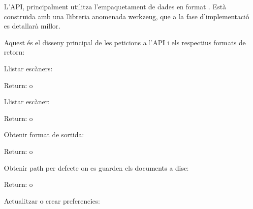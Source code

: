 \documentclass[letterpaper,11pt,catalan]{sphinxmanual}
\begin{document}
L'API, principalment utilitza l'empaquetament de dades en format .
Està construïda amb una llibreria anomenada \sphinxquotedblleft{}werkzeug\sphinxquotedblright{}, que a la fase d'implementació es detallarà millor.

Aquest és el disseny principal de les peticions a l'API i els respectius formats de retorn:

Llistar escàners:

\begin{sphinxVerbatim}[commandchars=\\\{\}]
 
\end{sphinxVerbatim}

Return: \sphinxcode{{[}scanners: n{]}} o \sphinxcode{{[}'NO SCANNERS'{]}}

Llistar escàner:

\begin{sphinxVerbatim}[commandchars=\\\{\}]
 
\end{sphinxVerbatim}

Return: \sphinxcode{{[}scanner: 1{]}} o \sphinxcode{{[}'NO SCANNER'{]}}

Obtenir format de sortida:

\begin{sphinxVerbatim}[commandchars=\\\{\}]
 
\end{sphinxVerbatim}

Return:  o 

Obtenir path per defecte on es guarden els documents a disc:

\begin{sphinxVerbatim}[commandchars=\\\{\}]
 
\end{sphinxVerbatim}

Return:  o 

Actualitzar o crear preferencies:

\begin{sphinxVerbatim}[commandchars=\\\{\}]
 
   
   
   
   
   
   
\end{sphinxVerbatim}
\end{document}
